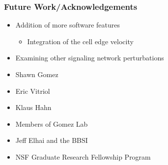 \documentclass{beamer}
\begin{document}

\begin{frame}
	\frametitle{Future Work/Acknowledgements}
	\begin{itemize}
	\item Addition of more software features
		\begin{itemize}
		\item Integration of the cell edge velocity
		\end{itemize}
	\item Examining other signaling network perturbations
	\end{itemize}
	
	\begin{itemize}
	\item Shawn Gomez
	\item Eric Vitriol 
	\item Klaus Hahn
	\item Members of Gomez Lab
	\item Jeff Elhai and the BBSI
	\item NSF Graduate Research Fellowship Program
	\end{itemize}	
\end{frame}
\end{document}
